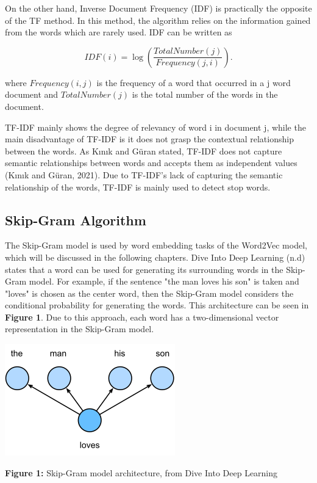 \documentclass[man]{apa7}
\begin{document}
On the other hand, Inverse Document Frequency (IDF) is practically the opposite of the TF method. In this method, the algorithm relies on the information gained from the words which are rarely used. IDF can be written as

\begin{equation}
IDF (i) = \log (\frac{TotalNumber(j)}{Frequency(j,i)}).
\end{equation}

where $Frequency(i,j)$ is the frequency of a word that occurred in a j word document and $TotalNumber(j)$ is the total number of the words in the document.

TF-IDF mainly shows the degree of relevancy of word i in document j, while the main disadvantage of TF-IDF is it does not grasp the contextual relationship between the words. As Kınık and Güran stated, TF-IDF does not capture semantic relationships between words and accepts them as independent values (Kınık and Güran, 2021). Due to TF-IDF's lack of capturing the semantic relationship of the words, TF-IDF is mainly used to detect stop words.

\subsection{Skip-Gram Algorithm}
The Skip-Gram model is used by word embedding tasks of the Word2Vec model, which will be discussed in the following chapters. Dive Into Deep Learning (n.d) states that a word can be used for generating its surrounding words in the Skip-Gram model. For example, if the sentence "the man loves his son" is taken and "loves" is chosen as the center word, then the Skip-Gram model considers the conditional probability for generating the words. This architecture can be seen in \textbf{Figure 1}. Due to this approach, each word has a two-dimensional vector representation in the Skip-Gram model. 

\begin{center}

\includegraphics[scale=1]{skip-gram.png}

\textbf{Figure 1:} Skip-Gram model architecture, from Dive Into Deep Learning\\[2\baselineskip]

\end{center}
\end{document}
